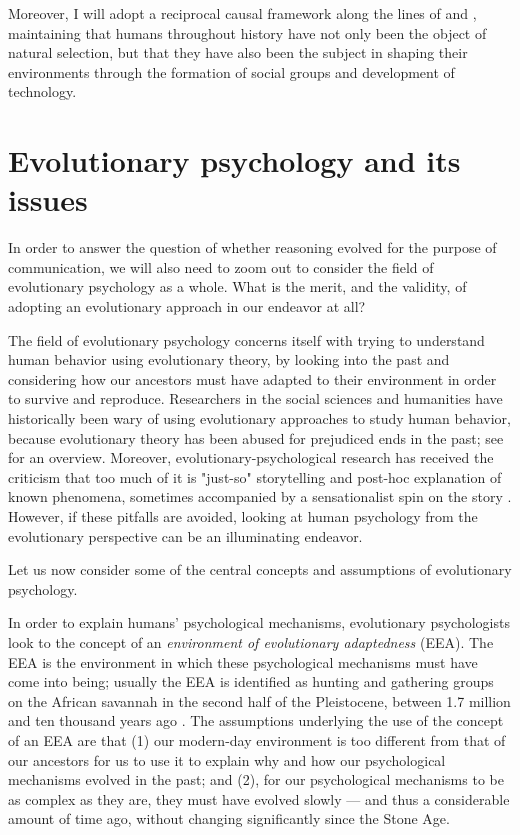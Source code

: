 
Moreover, I will adopt a reciprocal causal framework along the lines of \citet{Laland13} and \citet{Svensson18}, maintaining that humans throughout history have not only been the object of natural selection, but that they have also been the subject in shaping their environments through the formation of social groups and development of technology.

\section{Evolutionary psychology and its issues}
\label{sec:evol-psych}
In order to answer the question of whether reasoning evolved for the purpose of communication, we will also need to zoom out to consider the field of evolutionary psychology as a whole. What is the merit, and the validity, of adopting an evolutionary approach in our endeavor at all?

The field of evolutionary psychology concerns itself with trying to understand human behavior using evolutionary theory, by looking into the past and considering how our ancestors must have adapted to their environment in order to survive and reproduce.
Researchers in the social sciences and humanities have historically been wary of using evolutionary approaches to study human behavior, because evolutionary theory has been abused for prejudiced ends in the past; see \citet[pp.~19--20]{LB02} for an overview. Moreover, evolutionary-psychological research has received the criticism that too much of it is "just-so" storytelling and post-hoc explanation of known phenomena, sometimes accompanied by a sensationalist spin on the story \citep{LB02}.
However, if these pitfalls are avoided, looking at human psychology from the evolutionary perspective can be an illuminating endeavor.

Let us now consider some of the central concepts and assumptions of evolutionary psychology.

In order to explain humans' psychological mechanisms, evolutionary psychologists look to the concept of an \emph{environment of evolutionary adaptedness} (EEA). The EEA is the environment in which these psychological mechanisms must have come into being; usually the EEA is identified as hunting and gathering groups on the African savannah in the second half of the Pleistocene, between 1.7 million and ten thousand years ago \citep{LB02} .
The assumptions underlying the use of the concept of an EEA are that (1) our modern-day environment is too different from that of our ancestors for us to use it to explain why and how our psychological mechanisms evolved in the past; and (2), for our psychological mechanisms to be as complex as they are, they must have evolved slowly --- and thus a considerable amount of time ago, without changing significantly since the Stone Age.

